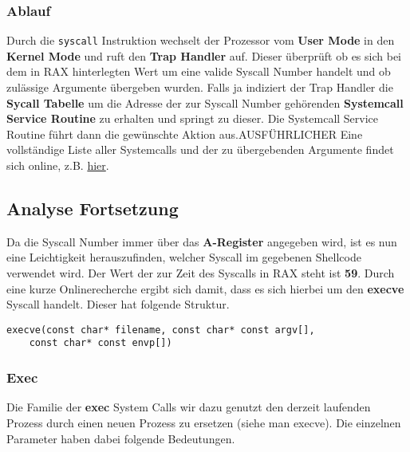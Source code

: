 \documentclass[12pt]{article}
\begin{document}
\subsubsection*{Ablauf}
Durch die \texttt{syscall} Instruktion wechselt der Prozessor vom \textbf{User Mode} in den \textbf{Kernel Mode} und ruft den \textbf{Trap Handler} auf. Dieser überprüft ob es sich bei dem in RAX hinterlegten Wert um eine valide Syscall Number handelt und ob zulässige Argumente übergeben wurden. Falls ja indiziert der Trap Handler die \textbf{Sycall Tabelle} um die Adresse der zur Syscall Number gehörenden \textbf{Systemcall Service Routine} zu erhalten und springt zu dieser.
\newline
\newline
Die Systemcall Service Routine führt dann die gewünschte Aktion aus.{\Large AUSFÜHRLICHER }
\newline
\newline
Eine vollständige Liste aller Systemcalls und der zu übergebenden Argumente findet sich online, z.B. \href{https://blog.rchapman.org/posts/Linux_System_Call_Table_for_x86_64/}{hier}.


\subsection{Analyse Fortsetzung}
Da die Syscall Number immer über das \textbf{A-Register} angegeben wird, ist es nun eine Leichtigkeit herauszufinden, welcher Syscall im gegebenen Shellcode verwendet wird. Der Wert der zur Zeit des Syscalls in RAX steht ist \textbf{59}. Durch eine kurze Onlinerecherche ergibt sich damit, dass es sich hierbei um den \textbf{execve} Syscall handelt. Dieser hat folgende Struktur.
\begin{lstlisting}
execve(const char* filename, const char* const argv[], 
    const char* const envp[])
\end{lstlisting}

\subsubsection{Exec}
Die Familie der \textbf{exec} System Calls wir dazu genutzt den derzeit laufenden Prozess durch einen neuen Prozess zu ersetzen (siehe man execve). Die einzelnen Parameter haben dabei folgende Bedeutungen.
\end{document}
